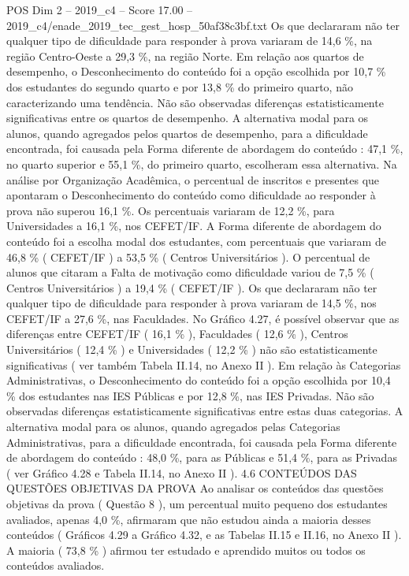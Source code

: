 \begin{textsample}{POS Dim 2 – 2019\_c4 – Score 17.00 – 2019\_c4/enade\_2019\_tec\_gest\_hosp\_50af38c3bf.txt}
Os que declararam não ter qualquer tipo de dificuldade para responder à prova variaram de 14,6 \%, na região Centro-Oeste a 29,3 \%, na região Norte.
Em relação aos quartos de desempenho, o Desconhecimento do conteúdo foi a opção escolhida por 10,7 \% dos estudantes do segundo quarto e por 13,8 \% do primeiro quarto, não caracterizando uma tendência.
Não são observadas diferenças estatisticamente significativas entre os quartos de desempenho.
A alternativa modal para os alunos, quando agregados pelos quartos de desempenho, para a dificuldade encontrada, foi causada pela Forma diferente de abordagem do conteúdo : 47,1 \%, no quarto superior e 55,1 \%, do primeiro quarto, escolheram essa alternativa.
Na análise por Organização Acadêmica, o percentual de inscritos e presentes que apontaram o Desconhecimento do conteúdo como dificuldade ao responder à prova não superou 16,1 \%.
Os percentuais variaram de 12,2 \%, para Universidades a 16,1 \%, nos CEFET/IF.
A Forma diferente de abordagem do conteúdo foi a escolha modal dos estudantes, com percentuais que variaram de 46,8 \% ( CEFET/IF ) a 53,5 \% ( Centros Universitários ).
O percentual de alunos que citaram a Falta de motivação como dificuldade variou de 7,5 \% ( Centros Universitários ) a 19,4 \% ( CEFET/IF ).
Os que declararam não ter qualquer tipo de dificuldade para responder à prova variaram de 14,5 \%, nos CEFET/IF a 27,6 \%, nas Faculdades.
No Gráfico 4.27, é possível observar que as diferenças entre CEFET/IF ( 16,1 \% ), Faculdades ( 12,6 \% ), Centros Universitários ( 12,4 \% ) e Universidades ( 12,2 \% ) não são estatisticamente significativas ( ver também Tabela II.14, no Anexo II ).
Em relação às Categorias Administrativas, o Desconhecimento do conteúdo foi a opção escolhida por 10,4 \% dos estudantes nas IES Públicas e por 12,8 \%, nas IES Privadas.
Não são observadas diferenças estatisticamente significativas entre estas duas categorias.
A alternativa modal para os alunos, quando agregados pelas Categorias Administrativas, para a dificuldade encontrada, foi causada pela Forma diferente de abordagem do conteúdo : 48,0 \%, para as Públicas e 51,4 \%, para as Privadas ( ver Gráfico 4.28 e Tabela II.14, no Anexo II ). 4.6 CONTEÚDOS DAS QUESTÕES OBJETIVAS DA PROVA Ao analisar os conteúdos das questões objetivas da prova ( Questão 8 ), um percentual muito pequeno dos estudantes avaliados, apenas 4,0 \%, afirmaram que não estudou ainda a maioria desses conteúdos ( Gráficos 4.29 a Gráfico 4.32, e as Tabelas II.15 e II.16, no Anexo II ).
A maioria ( 73,8 \% ) afirmou ter estudado e aprendido muitos ou todos os conteúdos avaliados.

\end{textsample}
